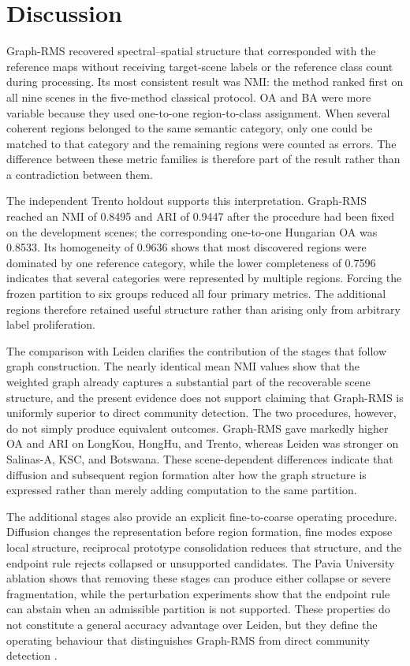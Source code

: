 \documentclass[10pt,a4paper,fleqn]{article}
\begin{document}
\section{Discussion}
\label{sec:discussion}

Graph-RMS recovered spectral--spatial structure that corresponded with the
reference maps without receiving target-scene labels or the reference class
count during processing. Its most consistent result was NMI: the method ranked
first on all nine scenes in the five-method classical protocol. OA and BA were more variable because they used
one-to-one region-to-class assignment. When several coherent regions belonged
to the same semantic category, only one could be matched to that category and
the remaining regions were counted as errors. The difference between these
metric families is therefore part of the result rather than a contradiction
between them.

The independent Trento holdout supports this interpretation. Graph-RMS reached
an NMI of 0.8495 and ARI of 0.9447 after the procedure had been fixed on the
development scenes; the corresponding one-to-one Hungarian OA was 0.8533. Its homogeneity of 0.9636 shows that most discovered
regions were dominated by one reference category, while the lower completeness
of 0.7596 indicates that several categories were represented by multiple
regions. Forcing the frozen partition to six groups reduced all four primary
metrics. The additional regions therefore retained useful structure rather
than arising only from arbitrary label proliferation.

The comparison with Leiden clarifies the contribution of the stages that
follow graph construction. The nearly identical mean NMI values show that the
weighted graph already captures a substantial part of the recoverable scene
structure, and the present evidence does not support claiming that Graph-RMS
is uniformly superior to direct community detection. The two procedures,
however, do not simply produce equivalent outcomes. Graph-RMS gave markedly
higher OA and ARI on LongKou, HongHu, and Trento, whereas Leiden was stronger
on Salinas-A, KSC, and Botswana. These scene-dependent differences indicate
that diffusion and subsequent region formation alter how the graph structure
is expressed rather than merely adding computation to the same partition.

The additional stages also provide an explicit fine-to-coarse operating
procedure. Diffusion changes the representation before region formation,
fine modes expose local structure, reciprocal prototype consolidation reduces
that structure, and the endpoint rule rejects collapsed or unsupported
candidates. The Pavia University ablation shows that removing these stages can
produce either collapse or severe fragmentation, while the perturbation
experiments show that the endpoint rule can abstain when an admissible
partition is not supported. These properties do not constitute a general
accuracy advantage over Leiden, but they define the operating behaviour that
distinguishes Graph-RMS from direct community detection
\citep{traag2019}.
\end{document}
